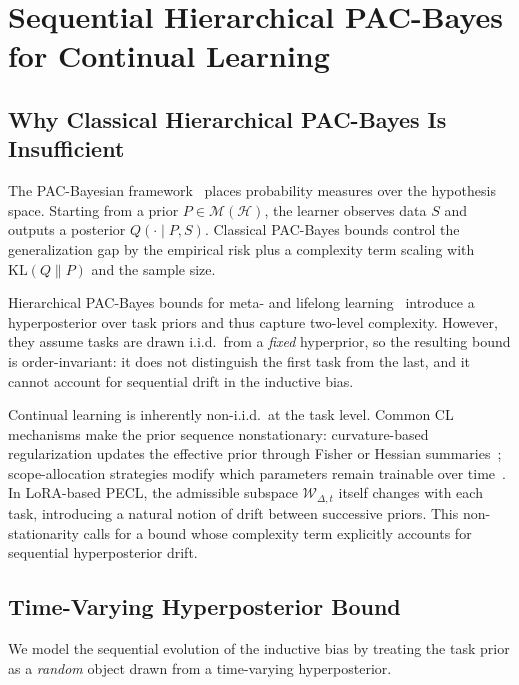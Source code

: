 \section{Sequential Hierarchical PAC-Bayes for Continual Learning}
\label{sec:pac-cl}

\subsection{Why Classical Hierarchical PAC-Bayes Is Insufficient}
\label{sec:why-new}

The PAC-Bayesian framework~\citep{mcallesterPACBayesianModelAveraging1999,mcallesterPACBayesianStochasticModel2003} places probability measures over the hypothesis space.
Starting from a prior $P \in \mathcal{M}(\mathcal{H})$, the learner observes data $S$ and outputs a posterior $Q(\cdot \mid P, S)$.
Classical PAC-Bayes bounds control the generalization gap by the empirical risk plus a complexity term scaling with $\mathrm{KL}(Q \| P)$ and the sample size.

Hierarchical PAC-Bayes bounds for meta- and lifelong learning~\citep{pentinaPACBayesianBoundLifelong2014,JMLR:v24:22-1254} introduce a hyperposterior over task priors and thus capture two-level complexity.
However, they assume tasks are drawn i.i.d.\ from a \emph{fixed} hyperprior, so the resulting bound is order-invariant: it does not distinguish the first task from the last, and it cannot account for sequential drift in the inductive bias.

Continual learning is inherently non-i.i.d.\ at the task level.
Common CL mechanisms make the prior sequence nonstationary: curvature-based regularization updates the effective prior through Fisher or Hessian summaries~\citep{EWC2017,SI2017}; scope-allocation strategies modify which parameters remain trainable over time~\citep{HAT2018,Supermasks2020,pmlr-v97-houlsby19a}.
In LoRA-based PECL, the admissible subspace $\mathcal{W}_{\Delta,t}$ itself changes with each task, introducing a natural notion of drift between successive priors.
This non-stationarity calls for a bound whose complexity term explicitly accounts for sequential hyperposterior drift.

\subsection{Time-Varying Hyperposterior Bound}
\label{sec:time-varying-bound}

We model the sequential evolution of the inductive bias by treating the task prior as a \emph{random} object drawn from a time-varying hyperposterior.

